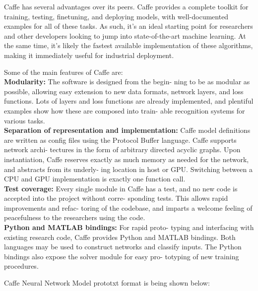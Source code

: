 Caffe has several advantages over its peers. Caffe provides a complete toolkit for training, testing, finetuning, and deploying models, with well-documented examples for all of these tasks. As such, it’s an ideal starting point for researchers and other developers looking to jump into state-of-the-art machine learning. At the same time, it’s likely the fastest available implementation of these algorithms, making it immediately useful for industrial deployment.

Some of the main features of Caffe are:\\
\textbf{Modularity:} The software is designed from the begin- ning to be as modular as possible, allowing easy extension to new data formats, network layers, and loss functions. Lots of layers and loss functions are already implemented, and plentiful examples show how these are composed into train- able recognition systems for various tasks. \\

 \textbf{Separation of representation and implementation:} Caffe model definitions are written as config files using the Protocol Buffer language. Caffe supports network archi- tectures in the form of arbitrary directed acyclic graphs. Upon instantiation, Caffe reserves exactly as much memory as needed for the network, and abstracts from its underly- ing location in host or GPU. Switching between a CPU and GPU implementation is exactly one function call. \\

\textbf{Test coverage:} Every single module in Caffe has a test, and no new code is accepted into the project without corre- sponding tests. This allows rapid improvements and refac- toring of the codebase, and imparts a welcome feeling of peacefulness to the researchers using the code. \\

\textbf{Python and MATLAB bindings:} For rapid proto- typing and interfacing with existing research code, Caffe provides Python and MATLAB bindings. Both languages may be used to construct networks and classify inputs. The Python bindings also expose the solver module for easy pro- totyping of new training procedures.

Caffe Neural Network Model prototxt format is being shown below:

